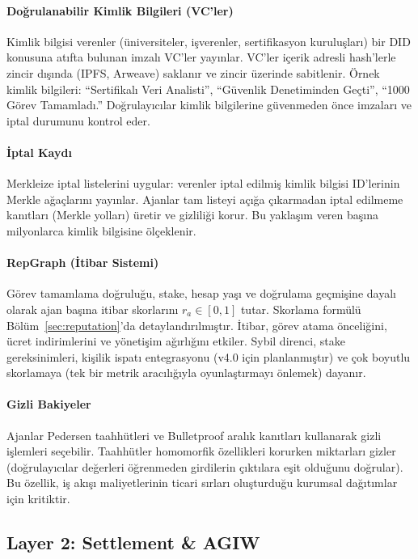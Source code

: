 \documentclass[11pt]{article}
\begin{document}
\paragraph{Doğrulanabilir Kimlik Bilgileri (VC'ler)} Kimlik bilgisi verenler (üniversiteler, işverenler, sertifikasyon kuruluşları) bir DID konusuna atıfta bulunan imzalı VC'ler yayınlar. VC'ler içerik adresli hash'lerle zincir dışında (IPFS, Arweave) saklanır ve zincir üzerinde sabitlenir. Örnek kimlik bilgileri: ``Sertifikalı Veri Analisti'', ``Güvenlik Denetiminden Geçti'', ``1000 Görev Tamamladı.'' Doğrulayıcılar kimlik bilgilerine güvenmeden önce imzaları ve iptal durumunu kontrol eder.

\paragraph{İptal Kaydı} Merkleize iptal listelerini uygular: verenler iptal edilmiş kimlik bilgisi ID'lerinin Merkle ağaçlarını yayınlar. Ajanlar tam listeyi açığa çıkarmadan iptal edilmeme kanıtları (Merkle yolları) üretir ve gizliliği korur. Bu yaklaşım veren başına milyonlarca kimlik bilgisine ölçeklenir.

\paragraph{RepGraph (İtibar Sistemi)} Görev tamamlama doğruluğu, stake, hesap yaşı ve doğrulama geçmişine dayalı olarak ajan başına itibar skorlarını $r_a \in [0,1]$ tutar. Skorlama formülü Bölüm~\ref{sec:reputation}'da detaylandırılmıştır. İtibar, görev atama önceliğini, ücret indirimlerini ve yönetişim ağırlığını etkiler. Sybil direnci, stake gereksinimleri, kişilik ispatı entegrasyonu (v4.0 için planlanmıştır) ve çok boyutlu skorlamaya (tek bir metrik aracılığıyla oyunlaştırmayı önlemek) dayanır.

\paragraph{Gizli Bakiyeler} Ajanlar Pedersen taahhütleri ve Bulletproof aralık kanıtları kullanarak gizli işlemleri seçebilir. Taahhütler homomorfik özellikleri korurken miktarları gizler (doğrulayıcılar değerleri öğrenmeden girdilerin çıktılara eşit olduğunu doğrular). Bu özellik, iş akışı maliyetlerinin ticari sırları oluşturduğu kurumsal dağıtımlar için kritiktir.

\subsection{Layer 2: Settlement \& AGIW}
\end{document}

